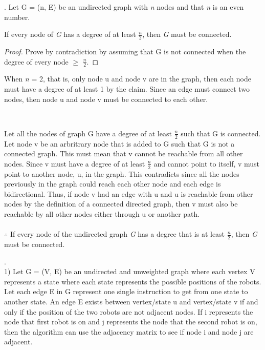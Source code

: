 \documentclass[12pt, a4paper]{article}
\begin{document}
. Let G = (n, E) be an undirected graph with \emph{n} nodes and that \emph{n} is an even number.
\\
\begin{claim}
    If every node of \emph{G} has a degree of at least \(\frac{n}{2}\), then \emph{G} must be connected.
\end{claim}

\begin{proof}
    Prove by contradiction by assuming that G is not connected when the degree of every node \(\geq\) \(\frac{n}{2}\). 
\end{proof}

\begin{base}
When \emph{n} = 2, that is, only node u and node v are in the graph, then each node must have a degree of at least 1 by the claim. 
Since an edge must connect two nodes, then node u and node v must be connected to each other.
\end{base}
\\
\begin{inductive}
    Let all the nodes of graph G have a degree of at least \(\frac{n}{2}\) such that G is connected.
    Let node v be an arbritrary node that is added to G such that G is not a connected graph.
    This must mean that v cannot be reachable from all other nodes.
    Since v must have a degree of at least \(\frac{n}{2}\) and cannot point to itself, v must point to another node, u, in the graph.
    This contradicts since all the nodes previously in the graph could reach each other node and each edge is bidirectional.
    Thus, if node v had an edge with u and u is reachable from other nodes by the definition of a connected directed graph, then v must also be reachable by all other nodes either through u or another path.
    \\
    \\
    \(\therefore\) If every node of the undirected graph \emph{G} has a degree that is at least \(\frac{n}{2}\), then \emph{G} must be connected.
\end{inductive}
. 
\\
1) Let G = (V, E) be an undirected and unweighted graph where each vertex V represents a state where each state represents the possible positions of the robots.
Let each edge E in G represent one single instruction to get from one state to another state.
An edge E exists between vertex/state u and vertex/state v if and only if the position of the two robots are not adjacent nodes.
If i represents the node that first robot is on and j represents the node that the second robot is on, then the algorithm can use the adjacency matrix to see if node i and node j are adjacent.
\end{document}
